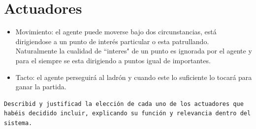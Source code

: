 \documentclass[a4paper,12pt]{article}
\begin{document}
\section*{\large Actuadores}
\begin{itemize}
	\item Movimiento: el agente puede moverse bajo dos circunstancias, está dirigiendose a un punto de interés particular o esta patrullando. Naturalmente la cualidad de ``interes" de un punto es ignorada por el agente y para el siempre se esta dirigiendo a puntos igual de importantes.
	\item Tacto: el agente perseguirá al ladrón y cuando este lo suficiente lo tocará para ganar la partida.
\end{itemize}
\texttt{Describid y justificad la elección de cada uno de los actuadores que habéis decidido incluir, explicando su función y relevancia dentro del sistema.}
\end{document}
